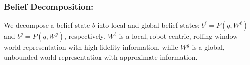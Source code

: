 \documentclass[letterpaper]{article} %
\newcommand{\ph}[1]{{\textbf{#1}:}} %
\begin{document}



%
\subsubsection{Belief Decomposition:} \hfill
\vspace{-0.25pt}

\noindent
We decompose a belief state $b$ into local and global belief states: $b^\ell = P(q, W^\ell)$ and $b^g = P(q, W^g)$, respectively.
$W^\ell$ is a local, robot-centric, rolling-window world representation with high-fidelity information, while $W^g$ is a global, unbounded world representation with approximate information.

\end{document}
